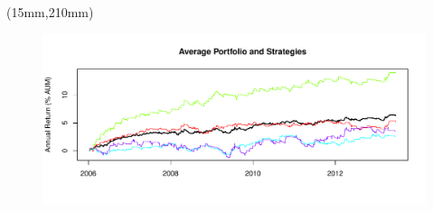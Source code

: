 \documentclass[nohyper,justified]{tufte-handout}\usepackage{graphicx, color}
\makeatletter
\def\maxwidth{ %
  \ifdim\Gin@nat@width>\linewidth
    \linewidth
  \else
    \Gin@nat@width
  \fi
}
\newenvironment{knitrout}{}{} %
\makeatother
\begin{document}
\begin{textblock*}{180mm}(15mm,210mm)
\begin{figure}
\vspace{0pt}
\begin{knitrout}
\color{fgcolor}
\includegraphics[width=\maxwidth]{figure/Performance2} 

\end{knitrout}

\end{figure}
\end{textblock*}
\end{document}
